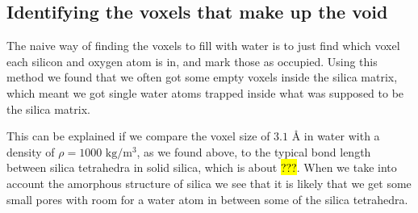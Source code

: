 \subsection{Identifying the voxels that make up the void\label{sec:inject_water_find_empty_voxels}}
The naive way of finding the voxels to fill with water is to just find which voxel each silicon and oxygen atom is in, and mark those as occupied. Using this method we found that we often got some empty voxels inside the silica matrix, which meant we got single water atoms trapped inside what was supposed to be the silica matrix. 

This can be explained if we compare the voxel size of $3.1 \text{ \AA}$ in water with a density of $\rho = 1000\text{ kg/m$^3$}$, as we found above, to the typical bond length between silica tetrahedra in solid silica, which is about \hl{???}. When we take into account the amorphous structure of silica we see that it is likely that we get some small pores with room for a water atom in between some of the silica tetrahedra.

